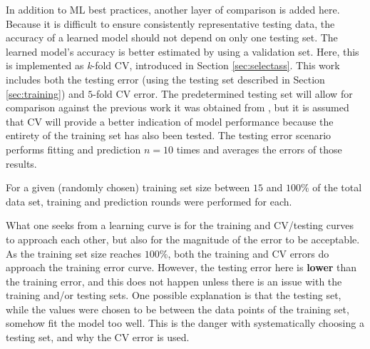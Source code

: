 In addition to \gls{ML} best practices, another layer of comparison is added
here.  Because it is difficult to ensure consistently representative testing
data, the accuracy of a learned model should not depend on only one testing
set.  The learned model's accuracy is better estimated by using a validation
set. Here, this is implemented as \textit{k}-fold \gls{CV}, introduced
in Section \ref{sec:selectass}. This work includes both the testing error
(using the testing set described in Section \ref{sec:training}) and $5$-fold
\gls{CV} error. The predetermined testing set will allow for comparison
against the previous work it was obtained from \cite{dayman_feasibility_2013},
but it is assumed that \gls{CV} will provide a better indication of
model performance because the entirety of the training set has also been
tested.  The testing error scenario performs fitting and prediction $n=10$
times and averages the errors of those results.

For a given (randomly chosen) training set size between $15$ and $100\%$ of the
total data set, training and prediction rounds were performed for each. 

What one seeks from a learning curve is for the training and \gls{CV}/testing
curves to approach each other, but also for the magnitude of the error to be
acceptable. As the training set size reaches $100\%$, both the training and
\gls{CV} errors do approach the training error curve.  However, the testing
error here is \textbf{lower} than the training error, and this does not happen
unless there is an issue with the training and/or testing sets. One possible
explanation is that the testing set, while the values were chosen to be between
the data points of the training set, somehow fit the model too well. This is
the danger with systematically choosing a testing set, and why the \gls{CV}
error is used. 



